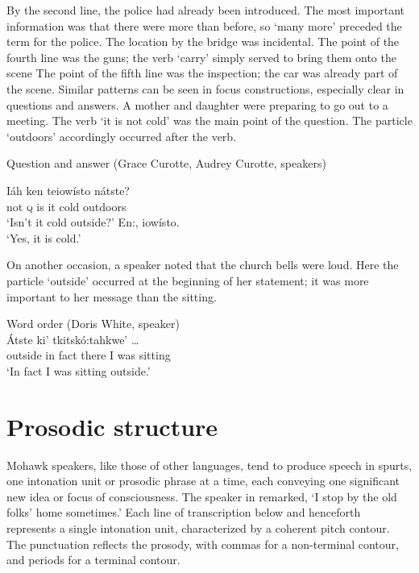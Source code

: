 \documentclass[output=paper,colorlinks,citecolor=brown]{langscibook}
\begin{document}
By the second line, the police had already been introduced. The most important information was that there were more than before, so `many more' preceded the term for the police. The location by the bridge was incidental. The point of the fourth line was the guns; the verb `carry' simply served to bring them onto the scene The point of the fifth line was the inspection; the car was already part of the scene. 
Similar patterns can be seen in focus constructions, especially clear in questions and answers. A mother and daughter were preparing to go out to a meeting. The verb `it is not cold' was the main point of the question. The particle `outdoors' accordingly occurred after the verb.

\ea Question and answer (Grace Curotte, Audrey Curotte, speakers)\\\label{ex:mithun:4}
\begin{xlist}[MM]
\gll Iáh ken teiowísto nátste?\\
     not \textsc{q} {is it cold} outdoors\\
\glt `Isn't it cold outside?'
 En:, iowísto.\\
\glt `Yes, it is cold.'
\end{xlist}
\z

On another occasion, a speaker noted that the church bells were loud. Here the particle `outside' occurred at the beginning of her statement; it was more important to her message than the sitting.
 
\ea\label{ex:mithun:6} Word order (Doris White, speaker)\\
\gll Átste ki' tkitskó:tahkwe'  \ldots \\
     outside  {in fact}  {there I was sitting}\\
\glt `In fact I was sitting outside.'
\z

\section{Prosodic structure}
\begin{sloppypar}
Mohawk speakers, like those of other languages, tend to produce speech in spurts, one intonation unit or prosodic phrase at a time, each conveying one significant new idea or focus of consciousness. The speaker in  remarked, `I stop by the old folks' home sometimes.' Each line of transcription below and henceforth represents a single intonation unit, characterized by a coherent pitch contour. The punctuation reflects the prosody, with commas for a non-terminal contour, and periods for a terminal contour.
\end{sloppypar}
\end{document}
